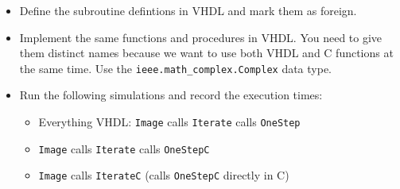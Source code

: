 \documentclass[12pt,epsf,makeidx,oneside]{book}
\begin{document}
\begin{itemize}[noitemsep]
\begin{itemize}[noitemsep]
    \end{itemize}
    \item Define the subroutine defintions in VHDL and mark them as foreign.
    \item Implement the same functions and procedures in VHDL. You need to give them distinct names because we want to use both VHDL and C functions at the same time. Use the {\tt ieee.math\_complex.Complex} data type.
    \item Run the following simulations and record the execution times:
    \begin{itemize}[noitemsep]
      \item Everything VHDL: {\tt Image} calls {\tt Iterate} calls {\tt OneStep}
      \item {\tt Image} calls {\tt Iterate} calls {\tt OneStepC}
      \item {\tt Image} calls {\tt IterateC} (calls {\tt OneStepC} directly in C)
    \end{itemize}
  \end{itemize}
\end{document}
